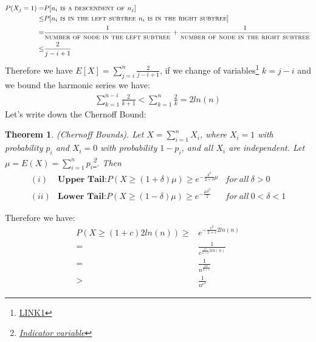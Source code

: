 \documentclass[a4paper]{article}
\newtheorem{theorem}{Theorem}
\begin{document}
\begin{align*}
P(X_j=1)=&P[n_i\textsc{ is a descendent of } n_j] \\
		\leq& P[n_i \textsc{ is in the left subtree } n_i \textsc{ is in the right subtree}]\\
		=& \frac{1}{\textsc{number of node in the left subtree}} + \frac{1}{\textsc{number of node in the right subtree}}\\
		\leq& \frac{2}{j-i+1}
\end{align*} 
Therefore we have $E[X]= \sum_{j=i}^n \frac{2}{j-i+1}$, if we change of variables\footnote{\href{http://math.stackexchange.com/questions/342061/double-summation-index-change-clarification}{LINK1}} $k= j-i$ and we bound the harmonic series we have:
\begin{align*}
\sum_{k=1}^{n-i} \frac{2}{k+1} < \sum_{k=1}^{n} \frac{2}{k}= 2 ln(n)
\end{align*}
Let's write down the Chernoff Bound:
\begin{theorem}
(Chernoff Bounds). Let $X=\sum_{i=1}^n X_{i}$, where $X_i = 1$ with probability $p_i$ and $X_i = 0$ with probability $1 − p_i$, and all $X_i$ are independent. Let $\mu = E(X) = \sum_{i=1}^n p_i$\footnote{\href{http://heather.cs.ucdavis.edu/~matloff/132/GenderExample.pdf}{Indicator variable}}. Then
\begin{align*}
(i) &\textbf{Upper Tail:} P(X \geq (1 + \delta)\mu) \geq e^{-\frac{\delta^2}{2+\delta}\mu} &for \ all \ \delta > 0 \\
(ii) &\textbf{Lower Tail:} P(X \geq (1 - \delta)\mu) \geq e^{-\frac{\mu\delta^2}{2}}      &for \ all \ 0< \delta < 1 
\end{align*}
\end{theorem}
Therefore we have:
\begin{align*}
P(X \geq (1 + c)2ln(n))\geq & e^{-\frac{c^2}{2+c}2ln(n)} \\
						=   & \frac{1}{e^{\frac{c^2}{2+c}2ln(n)}}\\
						=   & \frac{1}{n^{\frac{2c^2}{2+c}}}\\
						>   & \frac{1}{n^{c^3}}
\end{align*}
\end{document}

